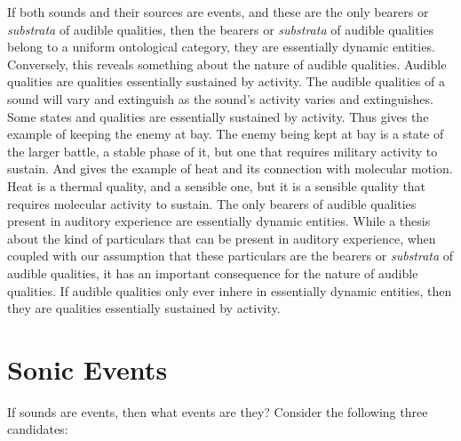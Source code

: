 \documentclass[12pt]{article}
\begin{document}
If both sounds and their sources are events, and these are the only bearers or \emph{substrata} of audible qualities, then the bearers or \emph{substrata} of audible qualities belong to a uniform ontological category, they are essentially dynamic entities. Conversely, this reveals something about the nature of audible qualities. Audible qualities are qualities essentially sustained by activity. The audible qualities of a sound will vary and extinguish as the sound’s activity varies and extinguishes. Some states and qualities are essentially sustained by activity. Thus \citet{Ryle:1949qr} gives the example of keeping the enemy at bay. The enemy being kept at bay is a state of the larger battle, a stable phase of it, but one that requires military activity to sustain. And \citet{kripke72} gives the example of heat and its connection with molecular motion. Heat is a thermal quality, and a sensible one, but it is a sensible quality that requires molecular activity to sustain. The only bearers of audible qualities present in auditory experience are essentially dynamic entities. While a thesis about the kind of particulars that can be present in auditory experience, when coupled with our assumption that these particulars are the bearers or \emph{substrata} of audible qualities, it has an important consequence for the nature of audible qualities. If audible qualities only ever inhere in essentially dynamic entities, then they are qualities essentially sustained by activity. 


\section{Sonic Events} %
\label{sec:sonic_events}

If sounds are events, then what events are they? Consider the following three candidates:
\end{document}
